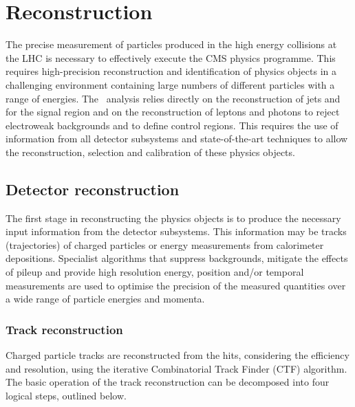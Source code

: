 \chapter{Reconstruction} %
\label{cha:reco}

The precise measurement of particles produced in the high energy collisions at the LHC 
is necessary to effectively execute the CMS physics programme. This requires high-precision
reconstruction and identification of physics objects in a challenging environment containing
large numbers of different particles with a range of energies. The \alphat~analysis 
relies directly on the reconstruction of jets and \met for the signal region and on the 
reconstruction of leptons and photons to reject electroweak 
backgrounds and to define control regions.
This requires the use of information from all detector subsystems and state-of-the-art
techniques to allow the reconstruction, selection and calibration of these physics objects.


\section{Detector reconstruction}

The first stage in reconstructing the physics objects is to produce the necessary
input information from the detector subsystems. This information may be tracks
(trajectories) of charged particles or energy measurements from calorimeter depositions. 
Specialist algorithms that suppress backgrounds, mitigate the effects of pileup and provide high resolution energy,
position and/or temporal measurements are used to optimise the precision of the 
measured quantities over a wide range of particle energies and momenta.

\subsection{Track reconstruction}

Charged particle tracks are reconstructed from the hits, considering the efficiency and resolution, 
using the iterative Combinatorial Track Finder (CTF) algorithm. The basic operation of the 
track reconstruction can be decomposed into four logical steps, outlined below.

